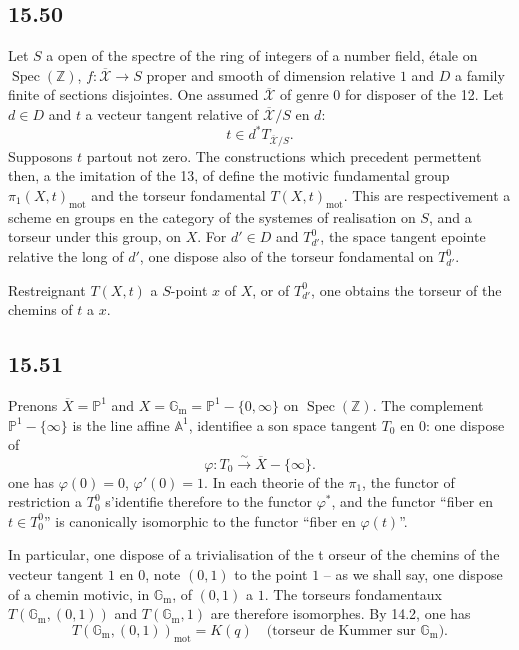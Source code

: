 \documentclass[12pt,a4paper]{article}
\theoremstyle{plain}
\theoremstyle{definition}
\theoremstyle{remark}
\DeclareMathOperator{\Spec}{Spec}
\newcommand*{\Gm}{\mathbb{G}_\mathrm{m}}
\newcommand{\bZ}{\mathbb{Z}}
\newcommand{\bP}{\mathbb{P}}
\newcommand{\bA}{\mathbb{A}}
\newcommand{\mot}{\mathrm{mot}}
\begin{document}
\subsection*{15.50}

Let $S$ a open of the spectre of the ring of integers of a number field, étale on $\Spec(\bZ)$, $f: \overline{\mathcal{X}} \to S$ proper and smooth of dimension relative $1$ and $D$ a family finite of sections disjointes. One assumed $\overline{\mathcal{X}}$ of genre $0$ for disposer of the 12. Let $d \in D$ and $t$ a vecteur tangent relative of $\overline{\mathcal{X}}/S$ en $d$:
\[
t \in d^* T_{\overline{\mathcal{X}}/S}.
\]
Supposons $t$ partout not zero. The constructions which precedent permettent then, a the imitation of the 13, of define the motivic fundamental group $\pi_1(X, t)_{\mot}$ and the torseur fondamental $T(X, t)_{\mot}$. This are respectivement a scheme en groups en the category of the systemes of realisation on $S$, and a torseur under this group, on $X$. For $d' \in D$ and $T_{d'}^0$, the space tangent epointe relative the long of $d'$, one dispose also of the torseur fondamental on $T_{d'}^0$.

Restreignant $T(X, t)$ a $S$-point $x$ of $X$, or of $T_{d'}^0$, one obtains the torseur of the chemins of $t$ a $x$.

\subsection*{15.51}

Prenons $\overline{X} = \bP^1$ and $X = \Gm = \bP^1 - \{0, \infty\}$ on $\Spec(\bZ)$. The complement $\bP^1 - \{\infty\}$ is the line affine $\bA^1$, identifiee a son space tangent $T_0$ en $0$: one dispose of
\[
\varphi: T_0 \xrightarrow{\sim} \overline{X} - \{\infty\}.
\]
one has $\varphi(0) = 0$, $\varphi'(0) = 1$. In each theorie of the $\pi_1$, the functor of restriction a $T_0^0$ s'identifie therefore to the functor $\varphi^*$, and the functor ``fiber en $t \in T_0^0$'' is canonically isomorphic to the functor ``fiber en $\varphi(t)$''.

In particular, one dispose of a trivialisation of the t
orseur of the chemins of the vecteur tangent $1$ en $0$, note $(0,1)$ to the point $1$ -- as we shall say, one dispose of a chemin motivic, in $\Gm$, of $(0,1)$ a $1$. The torseurs fondamentaux $T(\Gm, (0,1))$ and $T(\Gm, 1)$ are therefore isomorphes. By 14.2, one has
\begin{equation}\label{eq:15.51.1}
T(\Gm, (0,1))_{\mot} = K(q) \quad \text{(torseur de Kummer sur } \Gm\text{)}.
\end{equation}
\end{document}
